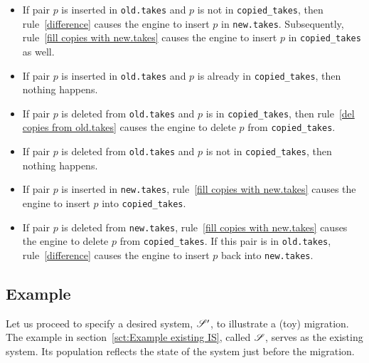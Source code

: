 \documentclass{elsarticle}
\begin{document}
\begin{itemize}
\item If pair $p$ is inserted in {\tt old.takes} and $p$ is not in {\tt copied\_takes},
      then rule~\ref{difference} causes the engine to insert $p$ in {\tt new.takes}.
      Subsequently, rule~\ref{fill copies with new.takes} causes the engine to insert $p$ in {\tt copied\_takes} as well.
\item If pair $p$ is inserted in {\tt old.takes} and $p$ is already in {\tt copied\_takes},
      then nothing happens.
\item If pair $p$ is deleted from {\tt old.takes} and $p$ is in {\tt copied\_takes},
      then rule~\ref{del copies from old.takes} causes the engine to delete $p$ from {\tt copied\_takes}.
\item If pair $p$ is deleted from {\tt old.takes} and $p$ is not in {\tt copied\_takes},
      then nothing happens.
\item If pair $p$ is inserted in {\tt new.takes},
      rule~\ref{fill copies with new.takes} causes the engine to insert $p$ into {\tt copied\_takes}.
\item If pair $p$ is deleted from {\tt new.takes},
      rule~\ref{fill copies with new.takes} causes the engine to delete $p$ from {\tt copied\_takes}.
      If this pair is in {\tt old.takes}, rule~\ref{difference} causes the engine to insert $p$ back into {\tt new.takes}.
\end{itemize}

\subsection{Example}
   Let us proceed to specify a desired system, $\mathscr{S}'$, to illustrate a (toy) migration.
   The example in section~\ref{sct:Example existing IS}, called $\mathscr{S}$, serves as the existing system.
   Its population reflects the state of the system just before the migration.
\end{document}

